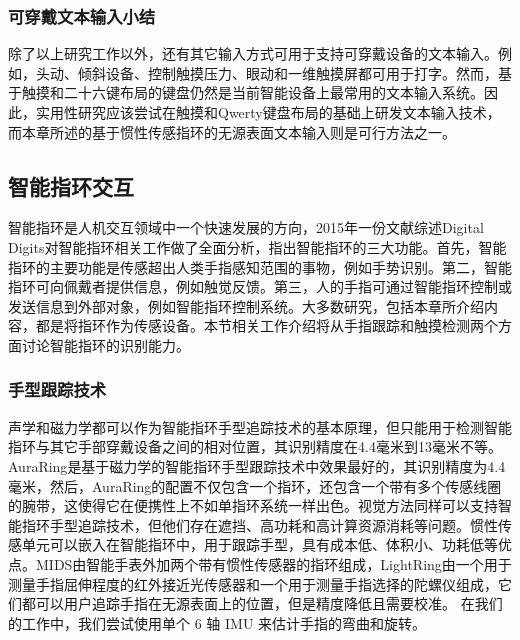 \subsubsection{可穿戴文本输入小结}

除了以上研究工作以外，还有其它输入方式可用于支持可穿戴设备的文本输入。例如，头动\cite{yu2017tap}、倾斜设备\cite{partridge2002tilttype}、控制触摸压力\cite{zhong2018forceboard}、眼动\cite{kurauchi2016eyeswipe, majaranta2007text, sarcar2013eyek}和一维触摸屏\cite{yu2016one}都可用于打字。然而，基于触摸和二十六键布局的键盘仍然是当前智能设备上最常用的文本输入系统。因此，实用性研究应该尝试在触摸和Qwerty键盘布局的基础上研发文本输入技术，而本章所述的基于惯性传感指环的无源表面文本输入则是可行方法之一。

\subsection{智能指环交互}

智能指环是人机交互领域中一个快速发展的方向，2015年一份文献综述Digital Digits\cite{shilkrot2015digital}对智能指环相关工作做了全面分析，指出智能指环的三大功能。首先，智能指环的主要功能是传感超出人类手指感知范围的事物，例如手势识别\cite{gupta2018asterisk, ogata2012iring, tsukada2004ubi, van2011finders, zhang2017fingorbits, zhang2018fingerping}。第二，智能指环可向佩戴者提供信息，例如触觉反馈\cite{prattichizzo2010remotouch, solazzi2010design}。第三，人的手指可通过智能指环控制或发送信息到外部对象，例如智能指环控制系统\cite{ashbrook2011nenya, chan2013fingerpad, harrison2009abracadabra, nguyen20153dtouch}。大多数研究，包括本章所介绍内容，都是将指环作为传感设备。本节相关工作介绍将从手指跟踪和触摸检测两个方面讨论智能指环的识别能力。

\subsubsection{手型跟踪技术}

声学\cite{zhang2017soundtrak}和磁力学\cite{chan2013fingerpad, chen2013utrack, parizi2019auraring}都可以作为智能指环手型追踪技术的基本原理，但只能用于检测智能指环与其它手部穿戴设备之间的相对位置，其识别精度在4.4毫米到13毫米不等。AuraRing\cite{parizi2019auraring}是基于磁力学的智能指环手型跟踪技术中效果最好的，其识别精度为4.4毫米，然后，AuraRing的配置不仅包含一个指环，还包含一个带有多个传感线圈的腕带，这使得它在便携性上不如单指环系统一样出色。视觉方法同样可以支持智能指环手型追踪技术\cite{chan2015cyclopsring, stearns2018touchcam, yang2012magic}，但他们存在遮挡、高功耗和高计算资源消耗等问题。惯性传感单元可以嵌入在智能指环中，用于跟踪手型，具有成本低、体积小、功耗低等优点。MIDS由智能手表外加两个带有惯性传感器的指环组成\cite{lam2002mids}，LightRing由一个用于测量手指屈伸程度的红外接近光传感器和一个用于测量手指选择的陀螺仪组成\cite{kienzle2014lightring}，它们都可以用户追踪手指在无源表面上的位置，但是精度降低且需要校准。
在我们的工作中，我们尝试使用单个 6 轴 IMU 来估计手指的弯曲和旋转。

